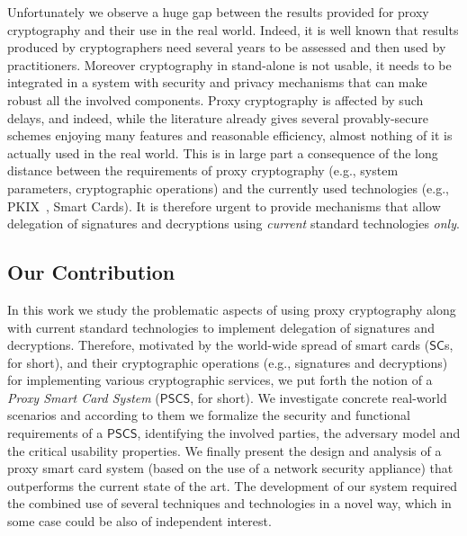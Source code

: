 \documentclass[preprint,authoryear,12pt]{elsarticle}
\newcommand{\SC}{\ensuremath{\mathsf{SC}}}
\newcommand{\PSCS}{\ensuremath{\mathsf{PSCS}}}
\begin{document}
Unfortunately we observe a huge gap between the results provided for proxy cryptography and their use in the real world. Indeed, it is well known that results produced by cryptographers need several years to be assessed and then used by practitioners. Moreover cryptography in stand-alone is not usable, it needs to be integrated in a system with  security and privacy mechanisms that can make robust all the involved components.
Proxy cryptography is affected by such delays, and indeed, while the literature already gives several provably-secure schemes enjoying many features and reasonable efficiency, almost nothing of it is actually used in the real world. %
This is in large part a consequence of the long distance between the requirements of proxy cryptography (e.g., system parameters, cryptographic operations) and the currently used technologies (e.g., PKIX~\citep{PKIX}, Smart Cards). It is therefore urgent to provide mechanisms that allow delegation of signatures and decryptions using {\em current} standard technologies {\em only}.



\subsection{Our Contribution}
In this work we study the problematic aspects of using proxy cryptography along with current standard technologies to implement delegation of signatures and decryptions. Therefore, motivated by the world-wide spread of smart cards (\SC s, for short), and their cryptographic operations (e.g., signatures and decryptions) for implementing various cryptographic services, we put forth the notion of a \emph{Proxy Smart Card System }(\PSCS, for short).
We investigate concrete real-world scenarios and according to them we formalize the security and functional requirements of a \PSCS, identifying the involved parties, the adversary model and the critical usability properties. We finally present the design and analysis of a proxy smart card system (based on the use of a network security appliance) that outperforms the current state of the art. The development of our system required the combined use of several techniques and technologies in a novel way, which in some case could be also of independent interest.
\end{document}
